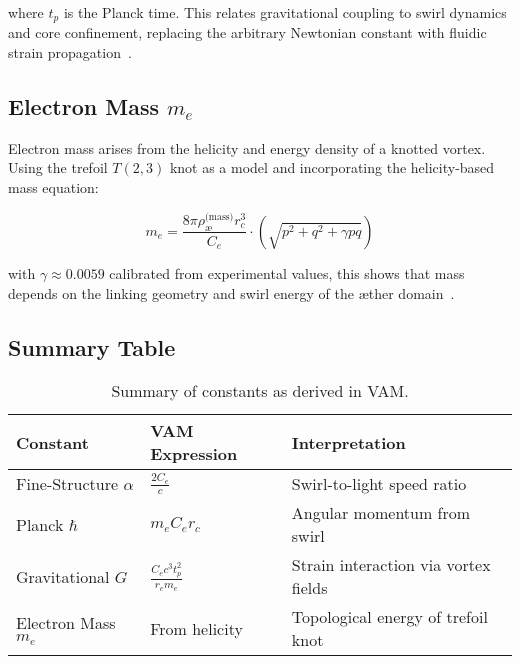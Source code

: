\documentclass[12pt]{article}
\begin{document}
            where \( t_p \) is the Planck time. This relates gravitational coupling to swirl dynamics and core confinement, replacing the arbitrary Newtonian constant with fluidic strain propagation~\cite{volovik2003universe}.
        
            \subsection{Electron Mass \boldmath\( m_e \)}
            Electron mass arises from the helicity and energy density of a knotted vortex. Using the trefoil \( T(2,3) \) knot as a model and incorporating the helicity-based mass equation:
        
            \begin{equation}
                m_e = \frac{8\pi \rho_{\text{\ae}}^\text{(mass)} r_c^3}{C_e} \cdot \left( \sqrt{p^2 + q^2 + \gamma pq} \right)
            \label{eq:electron_mass_vam}
            \end{equation}
        
            with \( \gamma \approx 0.0059 \) calibrated from experimental values, this shows that mass depends on the linking geometry and swirl energy of the æther domain~\cite{kleckner2013knots, moffatt1969knottedness}.
        
            \subsection{Summary Table}
        
            \begin{table}[H]
                \centering
                \begin{tabular}{|l|l|l|}
                    \hline
                    \textbf{Constant} & \textbf{VAM Expression} & \textbf{Interpretation} \\
                    \hline
                    Fine-Structure \( \alpha \) & \( \frac{2C_e}{c} \) & Swirl-to-light speed ratio \\
                    Planck \( \hbar \) & \( m_e C_e r_c \) & Angular momentum from swirl \\
                    Gravitational \( G \) & \( \frac{C_e c^3 t_p^2}{r_c m_e} \) & Strain interaction via vortex fields \\
                    Electron Mass \( m_e \) & From helicity & Topological energy of trefoil knot \\
                    \hline
                \end{tabular}
                \caption{Summary of constants as derived in VAM.}
                \label{tab:constants_summary}
            \end{table}
        
\end{document}
